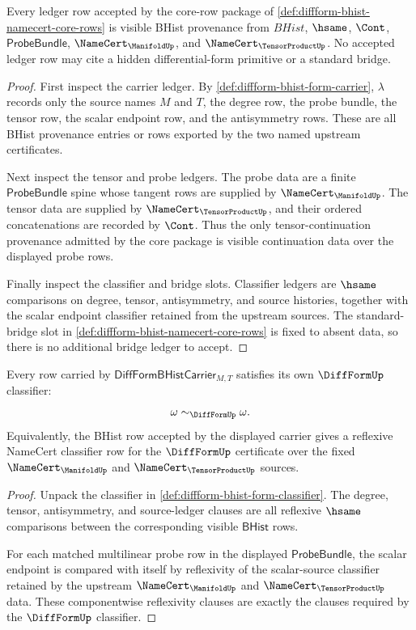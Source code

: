 \begin{theorem}
\label{thm:diffform-bhist-ledger-exactness-obligation}
Every ledger row accepted by the core-row package of
\autoref{def:diffform-bhist-namecert-core-rows} is visible BHist provenance
from $BHist$, $\hsame$, $\Cont$, $\mathsf{ProbeBundle}$,
$\NameCert_{\ManifoldUp}$, and $\NameCert_{\TensorProductUp}$. No accepted
ledger row may cite a hidden differential-form primitive or a standard bridge.
\end{theorem}
\begin{proof}
First inspect the carrier ledger. By
\autoref{def:diffform-bhist-form-carrier}, $\lambda$ records only the source
names $M$ and $T$, the degree row, the probe bundle, the tensor row, the
scalar endpoint row, and the antisymmetry rows. These are all BHist
provenance entries or rows exported by the two named upstream certificates.

Next inspect the tensor and probe ledgers. The probe data are a finite
$\mathsf{ProbeBundle}$ spine whose tangent rows are supplied by
$\NameCert_{\ManifoldUp}$. The tensor data are supplied by
$\NameCert_{\TensorProductUp}$, and their ordered concatenations are recorded
by $\Cont$. Thus the only tensor-continuation provenance admitted by the
core package is visible continuation data over the displayed probe rows.

Finally inspect the classifier and bridge slots. Classifier ledgers are
$\hsame$ comparisons on degree, tensor, antisymmetry, and source histories,
together with the scalar endpoint classifier retained from the upstream
sources. The standard-bridge slot in
\autoref{def:diffform-bhist-namecert-core-rows} is fixed to absent data, so
there is no additional bridge ledger to accept.
\end{proof}

\begin{theorem}
\label{thm:diffform-classifier-reflexivity-obligation}
Every row carried by $\mathsf{DiffFormBHistCarrier}_{M,T}$ satisfies its own
$\DiffFormUp$ classifier:
$$
\omega\sim_{\DiffFormUp}\omega.
$$
Equivalently, the BHist row accepted by the displayed carrier gives a
reflexive NameCert classifier row for the $\DiffFormUp$ certificate over the
fixed $\NameCert_{\ManifoldUp}$ and $\NameCert_{\TensorProductUp}$ sources.
\end{theorem}
\begin{proof}
Unpack the classifier in \autoref{def:diffform-bhist-form-classifier}. The
degree, tensor, antisymmetry, and source-ledger clauses are all reflexive
$\hsame$ comparisons between the corresponding visible $\mathsf{BHist}$ rows.

For each matched multilinear probe row in the displayed $\mathsf{ProbeBundle}$,
the scalar endpoint is compared with itself by reflexivity of the scalar-source
classifier retained by the upstream $\NameCert_{\ManifoldUp}$ and
$\NameCert_{\TensorProductUp}$ data. These componentwise reflexivity clauses
are exactly the clauses required by the $\DiffFormUp$ classifier.
\end{proof}

